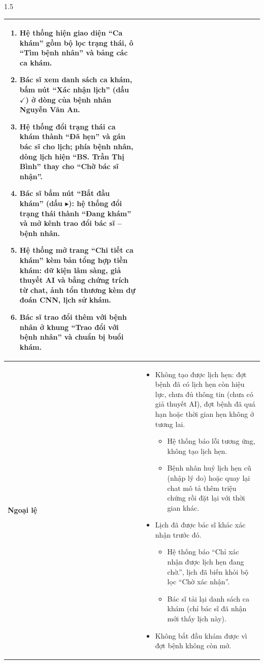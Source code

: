 \begin{spacing}{1.5}
\begin{longtable}{|>{\raggedright\arraybackslash}p{}|>{\raggedright\arraybackslash}p{}|}
\begin{enumerate}[nosep,leftmargin=*,start=7]
  \item Hệ thống hiện giao diện ``Ca khám'' gồm bộ lọc trạng thái, ô ``Tìm bệnh nhân'' và bảng các ca khám.
  \item Bác sĩ xem danh sách ca khám, bấm nút ``Xác nhận lịch'' (dấu $\checkmark$) ở dòng của bệnh nhân Nguyễn Văn An.
  \item Hệ thống đổi trạng thái ca khám thành ``Đã hẹn'' và gán bác sĩ cho lịch; phía bệnh nhân, dòng lịch hiện ``BS. Trần Thị Bình'' thay cho ``Chờ bác sĩ nhận''.
  \item Bác sĩ bấm nút ``Bắt đầu khám'' (dấu $\blacktriangleright$): hệ thống đổi trạng thái thành ``Đang khám'' và mở kênh trao đổi bác sĩ -- bệnh nhân.
  \item Hệ thống mở trang ``Chi tiết ca khám'' kèm bản tổng hợp tiền khám: dữ kiện lâm sàng, giả thuyết AI và bằng chứng trích từ chat, ảnh tổn thương kèm dự đoán CNN, lịch sử khám.
  \item Bác sĩ trao đổi thêm với bệnh nhân ở khung ``Trao đổi với bệnh nhân'' và chuẩn bị buổi khám.
\end{enumerate} \\ \hline
\textbf{Ngoại lệ} &
\begin{itemize}[nosep,leftmargin=2.6em,labelwidth=2em,labelsep=0.5em,align=left]
  \item[7.] Không tạo được lịch hẹn: đợt bệnh đã có lịch hẹn còn hiệu lực, chưa đủ thông tin (chưa có giả thuyết AI), đợt bệnh đã quá hạn hoặc thời gian hẹn không ở tương lai.
  \begin{itemize}[nosep,leftmargin=3em,labelwidth=2.4em,labelsep=0.4em,align=left]
    \item[7.1] Hệ thống báo lỗi tương ứng, không tạo lịch hẹn.
    \item[7.2] Bệnh nhân huỷ lịch hẹn cũ (nhập lý do) hoặc quay lại chat mô tả thêm triệu chứng rồi đặt lại với thời gian khác.
  \end{itemize}
  \item[10.] Lịch đã được bác sĩ khác xác nhận trước đó.
  \begin{itemize}[nosep,leftmargin=3em,labelwidth=2.4em,labelsep=0.4em,align=left]
    \item[10.1] Hệ thống báo ``Chỉ xác nhận được lịch hẹn đang chờ.'', lịch đã biến khỏi bộ lọc ``Chờ xác nhận''.
    \item[10.2] Bác sĩ tải lại danh sách ca khám (chỉ bác sĩ đã nhận mới thấy lịch này).
  \end{itemize}
  \item[12.] Không bắt đầu khám được vì đợt bệnh không còn mở.

\end{itemize}
\end{longtable}
\end{spacing}
